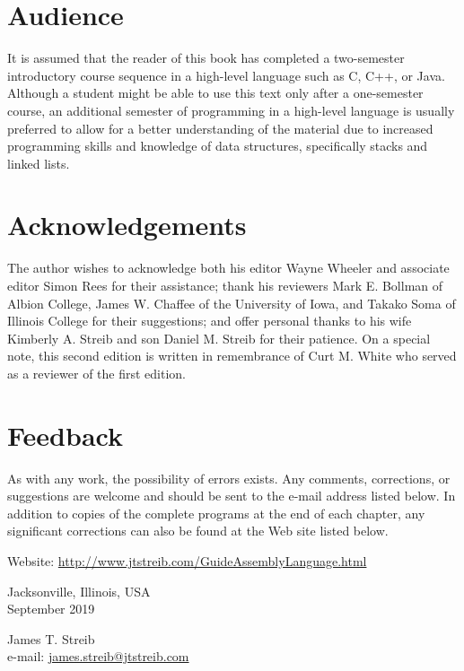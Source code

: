 \documentclass[10pt]{book}
\begin{document}
\section{Audience}
It is assumed that the reader of this book has completed a two-semester introductory course sequence in a high-level language such as C, C++, or Java. Although a student might be able to use this text only after a one-semester course, an additional semester of programming in a high-level language is usually preferred to allow for a better understanding of the material due to increased programming skills and knowledge of data structures, specifically stacks and linked lists.

\section{Acknowledgements}
The author wishes to acknowledge both his editor Wayne Wheeler and associate editor Simon Rees for their assistance; thank his reviewers Mark E. Bollman of Albion College, James W. Chaffee of the University of Iowa, and Takako Soma of Illinois College for their suggestions; and offer personal thanks to his wife Kimberly A. Streib and son Daniel M. Streib for their patience. On a special note, this second edition is written in remembrance of Curt M. White who served as a reviewer of the first edition.


\section{Feedback}
As with any work, the possibility of errors exists. Any comments, corrections, or suggestions are welcome and should be sent to the e-mail address listed below. In addition to copies of the complete programs at the end of each chapter, any significant corrections can also be found at the Web site listed below.

Website: \href{http://www.jtstreib.com/GuideAssemblyLanguage.html}{http://www.jtstreib.com/GuideAssemblyLanguage.html}

Jacksonville, Illinois, USA\\
September 2019

James T. Streib\\
e-mail: \href{mailto:james.streib@jtstreib.com}{james.streib@jtstreib.com}
\end{document}
